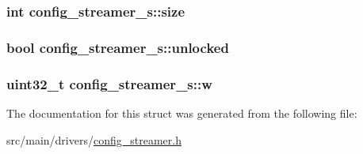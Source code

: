 \hypertarget{structconfig__streamer__s_a571ba2b6208f4365182a4d736da5b533}{
\subsubsection[{size}]{\setlength{\rightskip}{0pt plus 5cm}int config\+\_\+streamer\+\_\+s\+::size}}\label{structconfig__streamer__s_a571ba2b6208f4365182a4d736da5b533}
\hypertarget{structconfig__streamer__s_a7e4cec097eada23b105f9720cc7bebe5}{
\subsubsection[{unlocked}]{\setlength{\rightskip}{0pt plus 5cm}bool config\+\_\+streamer\+\_\+s\+::unlocked}}\label{structconfig__streamer__s_a7e4cec097eada23b105f9720cc7bebe5}
\hypertarget{structconfig__streamer__s_aabb0121c5cb2ac2b89c03ca710b27794}{
\subsubsection[{w}]{\setlength{\rightskip}{0pt plus 5cm}uint32\+\_\+t config\+\_\+streamer\+\_\+s\+::w}}\label{structconfig__streamer__s_aabb0121c5cb2ac2b89c03ca710b27794}


The documentation for this struct was generated from the following file\+:\begin{DoxyCompactItemize}
\item 
src/main/drivers/\hyperlink{config__streamer_8h}{config\+\_\+streamer.\+h}\end{DoxyCompactItemize}
